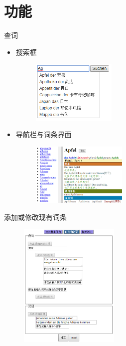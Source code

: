 \documentclass[notheorems,xetex]{beamer}
\begin{document}
\section{功能}
\frame{\tableofcontents[currentsection]}
\begin{frame}{查词}

\begin{itemize}
	\item 搜索框
     \begin{figure}
	  \centering
	  \includegraphics[height=3cm]{search1.png}
	\end{figure}	
	\item 导航栏与词条界面
     \begin{figure}
	\centering
	\includegraphics[height=3cm]{search2.png}
	\end{figure}
\end{itemize}
\begin{figure}
\end{figure}
\end{frame}

\begin{frame}{添加或修改现有词条}
\begin{figure}
	\includegraphics[height=6cm]{edit.png}
\end{figure}
\end{frame}
\end{document}
